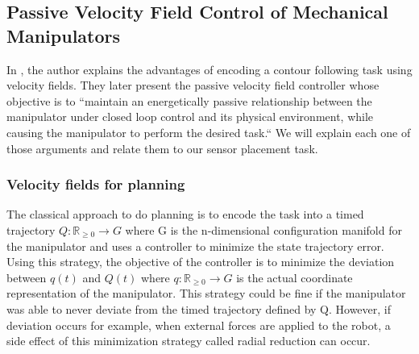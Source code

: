 \subsection{Passive Velocity Field Control of Mechanical Manipulators}
In \cite{li1999passive}, the author explains the advantages of encoding a contour following task using velocity fields. 
They later present the passive velocity field controller whose objective is to ``maintain an energetically passive relationship between the manipulator under closed loop control and
its physical environment, while causing the manipulator to perform the desired task.``
We will explain each one of those arguments and relate them to our sensor placement task.
\subsubsection{Velocity fields for planning}
The classical approach to do planning is to encode the task into a timed trajectory $Q:\mathbb R_{\ge 0} \rightarrow G$ where G is the n-dimensional configuration manifold for the manipulator and uses a controller to minimize the state trajectory error.
Using this strategy, the objective of the controller is to minimize the deviation between $q(t)$ and $Q(t)$ where $q:\mathbb R_{\ge 0} \rightarrow G$ is the actual coordinate representation of the manipulator.
This strategy could be fine if the manipulator was able to never deviate from the timed trajectory defined by Q. However, if deviation occurs for example, when external forces are applied to the
robot, a side effect of this minimization strategy called radial reduction can occur.

